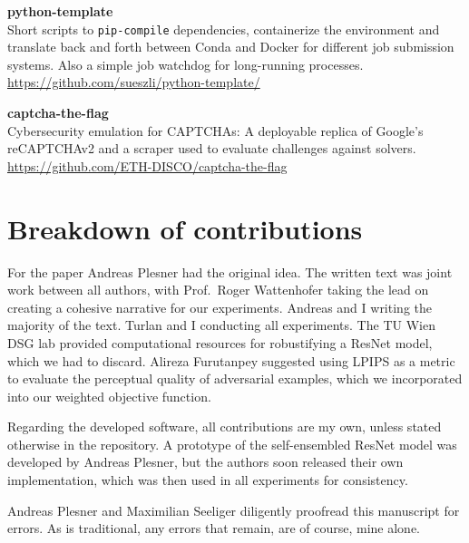 \documentclass[a4paper, oneside]{discothesis}
\newcommand{\linebreaks}{\vspace*{0.5em}}
\begin{document}
\linebreaks

\begin{samepage}
	\begin{spacing}{1}
		\textbf{python-template} \\
		Short scripts to \texttt{pip-compile} dependencies, containerize the environment and translate back and forth between Conda and Docker for different job submission systems. Also a simple job watchdog for long-running processes. \\ 
		\url{https://github.com/sueszli/python-template/}
	\end{spacing}
\end{samepage}
	
\linebreaks

\begin{samepage}
	\begin{spacing}{1}
		\textbf{captcha-the-flag} \\
		Cybersecurity emulation for CAPTCHAs: A deployable replica of Google's reCAPTCHAv2 and a scraper used to evaluate challenges against solvers. \\
		\url{https://github.com/ETH-DISCO/captcha-the-flag}
	\end{spacing}
\end{samepage}

\section*{Breakdown of contributions}

For the paper Andreas Plesner had the original idea. The written text was joint work between all authors, with Prof.\ Roger Wattenhofer taking the lead on creating a cohesive narrative for our experiments. Andreas and I writing the majority of the text. Turlan and I conducting all experiments. The TU Wien DSG lab provided computational resources for robustifying a ResNet model, which we had to discard. Alireza Furutanpey suggested using LPIPS as a metric to evaluate the perceptual quality of adversarial examples, which we incorporated into our weighted objective function.

Regarding the developed software, all contributions are my own, unless stated otherwise in the repository. A prototype of the self-ensembled ResNet model was developed by Andreas Plesner, but the authors soon released their own implementation, which was then used in all experiments for consistency.

Andreas Plesner and Maximilian Seeliger diligently proofread this manuscript for errors. As is traditional, any errors that remain, are of course, mine alone.
\end{document}
